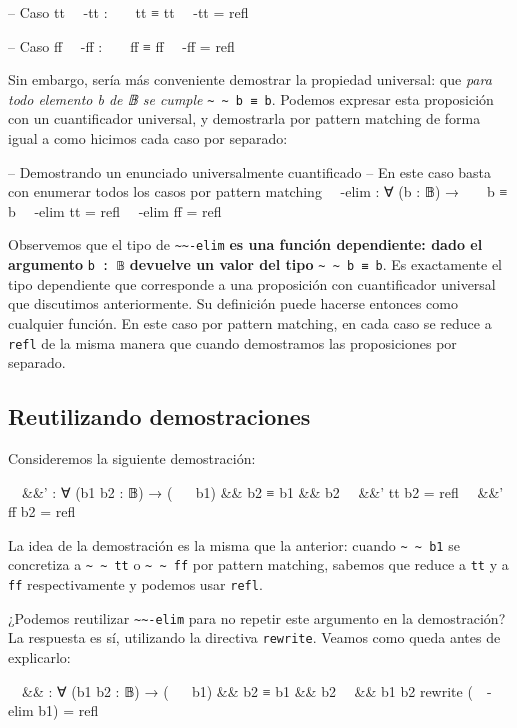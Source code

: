\documentclass[11pt]{article} %
\begin{document}
\begin{code}
-- Caso tt
~~-tt : ~ ~ tt ≡ tt
~~-tt = refl

-- Caso ff
~~-ff : ~ ~ ff ≡ ff
~~-ff = refl
\end{code}

Sin embargo, sería más conveniente demostrar la propiedad universal: que \textit{para todo elemento b de 𝔹 se cumple} \verb|~ ~ b ≡ b|. Podemos expresar esta proposición con un cuantificador universal, y demostrarla por pattern matching de forma igual a como hicimos cada caso por separado:

\begin{code}
-- Demostrando un enunciado universalmente cuantificado
-- En este caso basta con enumerar todos los casos por pattern matching
~~-elim : ∀ (b : 𝔹) → ~ ~ b ≡ b
~~-elim tt = refl
~~-elim ff = refl
\end{code}

Observemos que el tipo de \verb|~~-elim| \textbf{es una función dependiente: dado el argumento} \verb|b : 𝔹| \textbf{devuelve un valor del tipo} \verb|~ ~ b ≡ b|. Es exactamente el tipo dependiente que corresponde a una proposición con cuantificador universal que discutimos anteriormente. Su definición puede hacerse  entonces como cualquier función. En este caso por pattern matching, en cada caso se reduce a \verb|refl| de la misma manera que cuando demostramos las proposiciones por separado. 


\subsection{Reutilizando demostraciones}
Consideremos la siguiente demostración:

\begin{code}
~~&&' : ∀ (b1 b2 : 𝔹) →  (~ ~ b1) && b2 ≡ b1 && b2
~~&&' tt b2 = refl
~~&&' ff b2 = refl
\end{code}

La idea de la demostración es la misma que la anterior: cuando \verb|~ ~ b1| se concretiza a \verb|~ ~ tt| o \verb|~ ~ ff| por pattern matching, sabemos que reduce a \verb|tt| y a \verb|ff| respectivamente y podemos usar \verb|refl|. 

¿Podemos reutilizar \verb|~~-elim| para no repetir este argumento en la demostración? La respuesta es sí, utilizando la directiva \verb|rewrite|. Veamos como queda antes de explicarlo:

\begin{code}
~~&& : ∀ (b1 b2 : 𝔹) →  (~ ~ b1) && b2 ≡ b1 && b2
~~&& b1 b2 rewrite (~~-elim b1) = refl
\end{code}    
\end{document}
